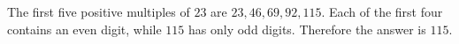 The first five positive multiples of $23$ are $23,46,69,92,115$. Each of the first four contains an even digit, while $115$ has only odd digits. Therefore the answer is $\boxed{115}$.
